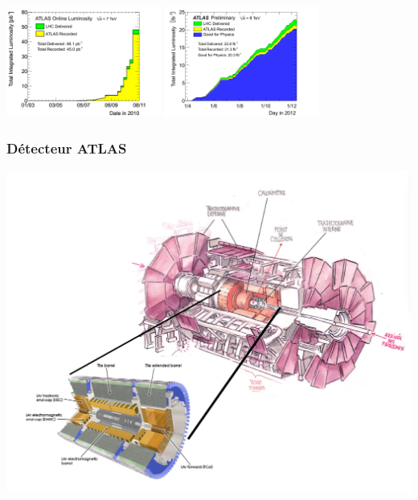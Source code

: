 \begin{frame}
\begin{center}
\includegraphics[width=0.38\textwidth]{Figures/Intro/sumLumiByWeek.png}
\includegraphics[width=0.38\textwidth]{Figures/Intro/intlumivstime2012DQ.png}
\end{center}
\end{frame}

\begin{frame}
\frametitle{D\'etecteur ATLAS}

\begin{center}
\vspace*{-0.3cm}
\includegraphics[width=1\textwidth]{Figures/Intro/ATLAS_full.png}
\end{center}

\end{frame}

